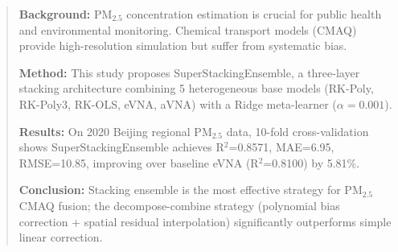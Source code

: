 \newenvironment{keywords}{
    \par\smallskip\textbf{Keywords:}}{
    \par\smallskip
}

\newcommand{\metricstable}[4]{
    \begin{table}[h]
    \centering
    \caption{#4}
    \label{tab:#1}
    \begin{tabular}{lccc}
    \toprule
    \textbf{Method} & \textbf{$\R^2$} & \textbf{MAE} & \textbf{RMSE} \\
    \midrule
    #2
    \bottomrule
    \end{tabular}
    \end{table}
}

\newcommand{\figref}[1]{Fig~\ref{fig:#1}}
\newcommand{\tabref}[1]{Table~\ref{tab:#1}}
\newcommand{\eqrefn}[1]{Eq~\ref{eq:#1}}

\def\@Citep#1{\citep{#1}}
\def\@Citet#1{\citet{#1}}
\let\citep\@Citep
\let\citet\@Citet




\maketitle

\begin{abstract}
\textbf{Background:} PM$_{2.5}$ concentration estimation is crucial for public health and environmental monitoring. Chemical transport models (CMAQ) provide high-resolution simulation but suffer from systematic bias.

\textbf{Method:} This study proposes SuperStackingEnsemble, a three-layer stacking architecture combining 5 heterogeneous base models (RK-Poly, RK-Poly3, RK-OLS, eVNA, aVNA) with a Ridge meta-learner ($\alpha=0.001$).

\textbf{Results:} On 2020 Beijing regional PM$_{2.5}$ data, 10-fold cross-validation shows SuperStackingEnsemble achieves R$^2$=0.8571, MAE=6.95, RMSE=10.85, improving over baseline eVNA (R$^2$=0.8100) by 5.81\%.

\textbf{Conclusion:} Stacking ensemble is the most effective strategy for PM$_{2.5}$ CMAQ fusion; the decompose-combine strategy (polynomial bias correction + spatial residual interpolation) significantly outperforms simple linear correction.
\end{abstract}

